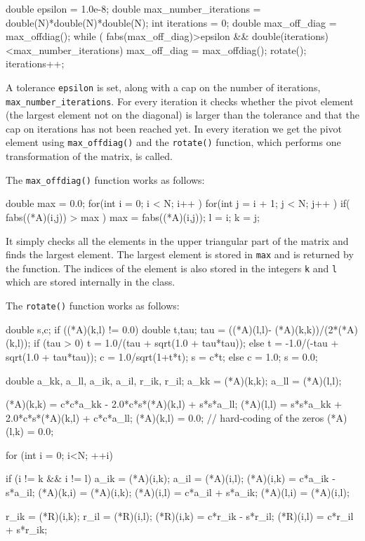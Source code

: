 \documentclass[reprint,english,notitlepage]{revtex4-1}  %
\begin{document}
\begin{cpp}
double epsilon = 1.0e-8;
double max_number_iterations = double(N)*double(N)*double(N);
int iterations = 0;
double max_off_diag = max_offdiag();
while ( fabs(max_off_diag)>epsilon &&
        double(iterations)<max_number_iterations){
    max_off_diag = max_offdiag();
    rotate();
    iterations++;
}
\end{cpp}

A tolerance \verb+epsilon+ is set, along with a cap on the number of iterations, \verb+max_number_iterations+. For every iteration it checks whether the pivot element (the largest element not on the diagonal) is larger than the tolerance and that the cap on iterations has not been reached yet. In every iteration we get the pivot element using \verb+max_offdiag()+ and the \verb+rotate()+ function, which performs one transformation of the matrix, is called.

The \verb+max_offdiag()+ function works as follows:

\begin{cpp}
double max = 0.0;
for(int i = 0; i < N; i++ ){
  for(int j = i + 1; j < N; j++ ){
    if( fabs((*A)(i,j)) > max ){
      max = fabs((*A)(i,j));
      l = i;
      k = j;
    }
  }
}
\end{cpp}

It simply checks all the elements in the upper triangular part of the matrix and finds the largest element. The largest element is stored in \verb+max+ and is returned by the function. The indices of the element is also stored in the integers \verb+k+ and \verb+l+ which are stored internally in the class.

The \verb+rotate()+ function works as follows:

\begin{cpp}
double s,c;
if ((*A)(k,l) != 0.0){
  double t,tau;
  tau = ((*A)(l,l)- (*A)(k,k))/(2*(*A)(k,l));
  if (tau > 0){
    t = 1.0/(tau + sqrt(1.0 + tau*tau));
  }
  else {
    t = -1.0/(-tau + sqrt(1.0 + tau*tau));
  }
  c = 1.0/sqrt(1+t*t);
  s = c*t;
}
else {
  c = 1.0;
  s = 0.0;
}

double a_kk, a_ll, a_ik, a_il, r_ik, r_il;
a_kk = (*A)(k,k);
a_ll = (*A)(l,l);

(*A)(k,k) = c*c*a_kk - 2.0*c*s*(*A)(k,l) + s*s*a_ll;
(*A)(l,l) = s*s*a_kk + 2.0*c*s*(*A)(k,l) + c*c*a_ll;
(*A)(k,l) = 0.0; // hard-coding of the zeros
(*A)(l,k) = 0.0;

for (int i = 0; i<N; ++i){
  if (i != k && i != l) {
    a_ik = (*A)(i,k);
    a_il = (*A)(i,l);
    (*A)(i,k) = c*a_ik - s*a_il;
    (*A)(k,i) = (*A)(i,k);
    (*A)(i,l) = c*a_il + s*a_ik;
    (*A)(l,i) = (*A)(i,l);
  }

  r_ik = (*R)(i,k);
  r_il = (*R)(i,l);
  (*R)(i,k) = c*r_ik - s*r_il;
  (*R)(i,l) = c*r_il + s*r_ik;
}
\end{cpp}
\end{document}
